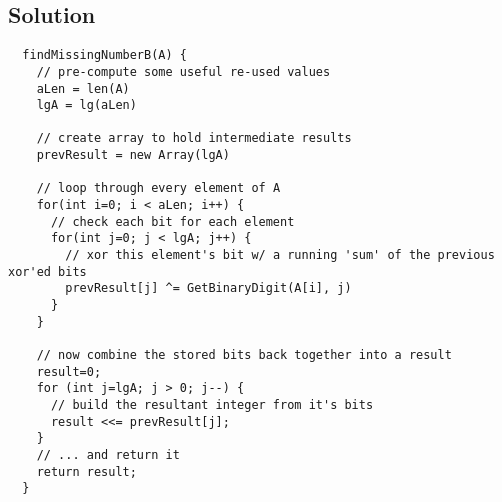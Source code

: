 \subsection*{Solution}

\begin{verbatim}
  findMissingNumberB(A) {
    // pre-compute some useful re-used values
    aLen = len(A)
    lgA = lg(aLen)

    // create array to hold intermediate results
    prevResult = new Array(lgA)

    // loop through every element of A
    for(int i=0; i < aLen; i++) {
      // check each bit for each element
      for(int j=0; j < lgA; j++) {
        // xor this element's bit w/ a running 'sum' of the previous xor'ed bits
        prevResult[j] ^= GetBinaryDigit(A[i], j) 
      }
    }

    // now combine the stored bits back together into a result
    result=0;
    for (int j=lgA; j > 0; j--) {
      // build the resultant integer from it's bits
      result <<= prevResult[j];
    }
    // ... and return it
    return result;
  }
\end{verbatim}
